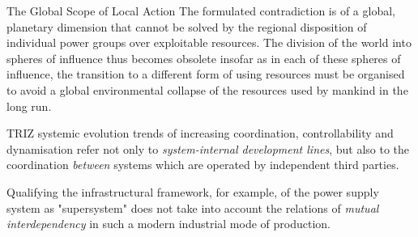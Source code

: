 \documentclass{beamer}
\begin{document}
\begin{frame}{The Global Scope of Local Action}
The formulated contradiction is of a global, planetary dimension that cannot
be solved by the regional disposition of individual power groups over
exploitable resources.  The division of the world into spheres of influence
thus becomes obsolete insofar as in each of these spheres of influence, the
transition to a different form of using resources must be organised to avoid a
global environmental collapse of the resources used by mankind in the long
run.

TRIZ systemic evolution trends of increasing coordination, controllability and
dynamisation refer not only to \emph{system-internal development lines}, but
also to the coordination \emph{between} systems which are operated by
independent third parties.

Qualifying the infrastructural framework, for example, of the power supply
system as "supersystem" does not take into account the relations of
\emph{mutual interdependency} in such a modern industrial mode of production.

\end{frame}
\end{document}
